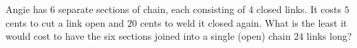 Angie has $6$ separate sections of chain, each consisting of $4$ closed links. It costs $5$ cents to cut a link open and $20$ cents to weld it closed again. What is the least it would cost to have the six sections joined into a single (open) chain $24$ links long?
